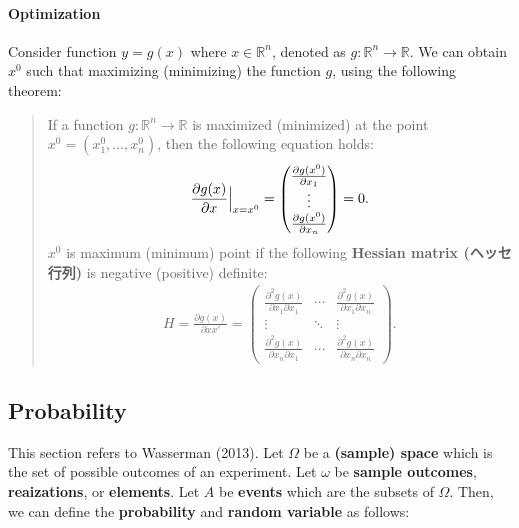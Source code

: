 \documentclass[
  12pt,
]{article}
\begin{document}
\hypertarget{optimization}{%
\paragraph{Optimization}\label{optimization}}

Consider function \(y = g(x)\) where \(x \in \mathbb{R}^{n}\), denoted as \(g: \mathbb{R}^{n} \to \mathbb{R}\).
We can obtain \(x^0\) such that maximizing (minimizing) the function \(g\), using the following theorem:

\begin{quote}
If a function \(g \colon \mathbb{R}^{n} \rightarrow \mathbb{R}\) is maximized (minimized) at the point \(x^{0} = (x_{1}^{0}, \ldots, x_{n}^{0})\), then the following equation holds:
\begin{align*}
\frac{\partial g (x)}{\partial x} \Big{\vert}_{x = x^{0}} 
= 
\begin{pmatrix}
\frac{\partial g (x^{0})}{\partial x_{1}} \\
\vdots \\
\frac{\partial g (x^{0})}{\partial x_{n}} 
\end{pmatrix}  
= 0.
\end{align*}
\(x^0\) is maximum (minimum) point if the following \textbf{Hessian matrix (ヘッセ行列)} is negative (positive) definite:
\begin{align*}
H = \frac{\partial g (x)}{\partial xx'} 
=
\begin{pmatrix}
\frac{\partial^{2} g (x)}{\partial x_{1} \partial x_{1}} 
& \cdots & \frac{\partial^{2} g (x)}{\partial x_{1} \partial x_{n}} \\
\vdots  &\ddots  &\vdots\\
\frac{\partial^{2} g (x)}{\partial x_{n} \partial x_{1}} 
& \cdots & \frac{\partial^{2} g (x)}{\partial x_{n} \partial x_{n}}
\end{pmatrix}.
\end{align*}
\end{quote}

\hypertarget{probability}{%
\subsection{Probability}\label{probability}}

This section refers to Wasserman (2013).
Let \(\Omega\) be a \textbf{(sample) space} which is the set of possible outcomes of an experiment.
Let \(\omega\) be \textbf{sample outcomes}, \textbf{reaizations}, or \textbf{elements}.
Let \(A\) be \textbf{events} which are the subsets of \(\Omega\).
Then, we can define the \textbf{probability} and \textbf{random variable} as follows:
\end{document}
